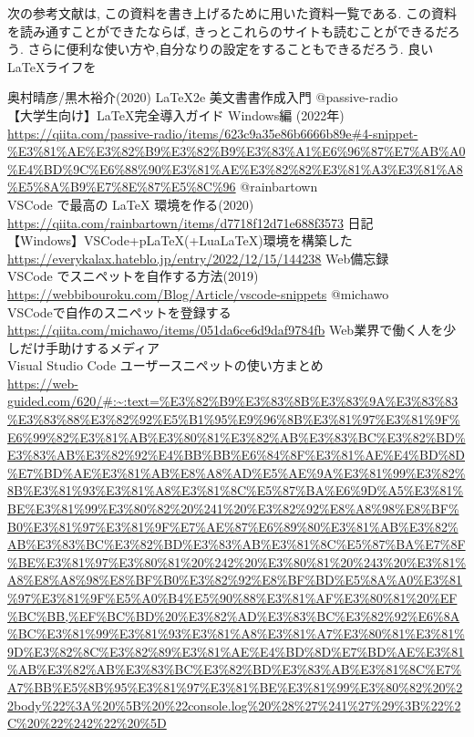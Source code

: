 \documentclass{ltjsarticle}
\begin{document}
次の参考文献は,
この資料を書き上げるために用いた資料一覧である.
この資料を読み通すことができたならば,
きっとこれらのサイトも読むことができるだろう.
さらに便利な使い方や,自分なりの設定をすることもできるだろう.
良い\LaTeX ライフを
\begin{thebibliography}{999}
  奥村晴彦/黒木裕介(2020)
  \LaTeX 2e 美文書書作成入門
  @passive-radio\\
  【大学生向け】LaTeX完全導入ガイド Windows編 (2022年)\\
  \url{https://qiita.com/passive-radio/items/623c9a35e86b6666b89e#4-snippet-%E3%81%AE%E3%82%B9%E3%82%B9%E3%83%A1%E6%96%87%E7%AB%A0%E4%BD%9C%E6%88%90%E3%81%AE%E3%82%82%E3%81%A3%E3%81%A8%E5%8A%B9%E7%8E%87%E5%8C%96}
  @rainbartown\\
  VSCode で最高の LaTeX 環境を作る(2020)
  \url{https://qiita.com/rainbartown/items/d7718f12d71e688f3573}
  日記\\
  【Windows】VSCode+pLaTeX(+LuaLaTeX)環境を構築した\\
  \url{https://everykalax.hateblo.jp/entry/2022/12/15/144238}
  Web備忘録\\
  VSCode でスニペットを自作する方法(2019)\\
  \url{https://webbibouroku.com/Blog/Article/vscode-snippets}
  @michawo\\
  VSCodeで自作のスニペットを登録する\\
  \url{https://qiita.com/michawo/items/051da6ce6d9daf9784fb}
  Web業界で働く人を少しだけ手助けするメディア\\
  Visual Studio Code ユーザースニペットの使い方まとめ\\
  \url{https://web-guided.com/620/#:~:text=%E3%82%B9%E3%83%8B%E3%83%9A%E3%83%83%E3%83%88%E3%82%92%E5%B1%95%E9%96%8B%E3%81%97%E3%81%9F%E6%99%82%E3%81%AB%E3%80%81%E3%82%AB%E3%83%BC%E3%82%BD%E3%83%AB%E3%82%92%E4%BB%BB%E6%84%8F%E3%81%AE%E4%BD%8D%E7%BD%AE%E3%81%AB%E8%A8%AD%E5%AE%9A%E3%81%99%E3%82%8B%E3%81%93%E3%81%A8%E3%81%8C%E5%87%BA%E6%9D%A5%E3%81%BE%E3%81%99%E3%80%82%20%241%20%E3%82%92%E8%A8%98%E8%BF%B0%E3%81%97%E3%81%9F%E7%AE%87%E6%89%80%E3%81%AB%E3%82%AB%E3%83%BC%E3%82%BD%E3%83%AB%E3%81%8C%E5%87%BA%E7%8F%BE%E3%81%97%E3%80%81%20%242%20%E3%80%81%20%243%20%E3%81%A8%E8%A8%98%E8%BF%B0%E3%82%92%E8%BF%BD%E5%8A%A0%E3%81%97%E3%81%9F%E5%A0%B4%E5%90%88%E3%81%AF%E3%80%81%20%EF%BC%BB,%EF%BC%BD%20%E3%82%AD%E3%83%BC%E3%82%92%E6%8A%BC%E3%81%99%E3%81%93%E3%81%A8%E3%81%A7%E3%80%81%E3%81%9D%E3%82%8C%E3%82%89%E3%81%AE%E4%BD%8D%E7%BD%AE%E3%81%AB%E3%82%AB%E3%83%BC%E3%82%BD%E3%83%AB%E3%81%8C%E7%A7%BB%E5%8B%95%E3%81%97%E3%81%BE%E3%81%99%E3%80%82%20%22body%22%3A%20%5B%20%22console.log%20%28%27%241%27%29%3B%22%2C%20%22%242%22%20%5D}

\end{thebibliography}
\end{document}
